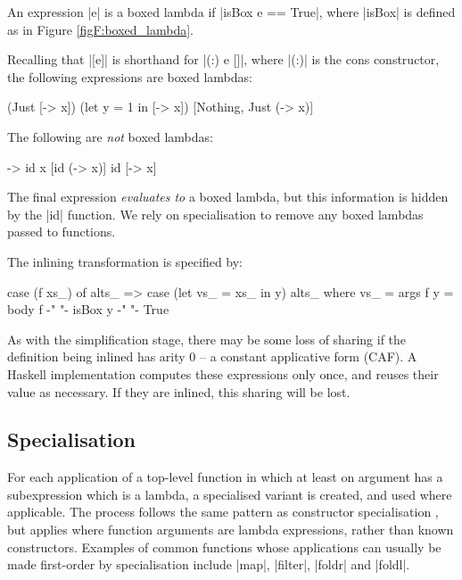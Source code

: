An expression |e| is a boxed lambda if |isBox e == True|, where |isBox| is defined as in Figure \ref{figF:boxed_lambda}.

\begin{example}
Recalling that |[e]| is shorthand for |(:) e []|, where |(:)| is the cons constructor, the following expressions are boxed lambdas:

\ignore\begin{code}
[\x -> x]
(Just [\x -> x])
(let y = 1 in [\x -> x])
[Nothing, Just (\x -> x)]
\end{code}

\noindent The following are \textit{not} boxed lambdas:

\ignore\begin{code}
\x -> id x
[id (\x -> x)]
id [\x -> x]
\end{code}

The final expression \textit{evaluates to} a boxed lambda, but this information is hidden by the |id| function. We rely on specialisation to remove any boxed lambdas passed to functions.
\end{example}

The inlining transformation is specified by:

\ignore\begin{code}
case (f xs_) of alts_
    => case (let vs_ = xs_ in y) alts_
    where
        vs_ = args f
        y = body f
        {-"  "-} isBox y {-"  "-} True
\end{code}

As with the simplification stage, there may be some loss of sharing if the definition being inlined has arity 0 -- a constant applicative form (CAF). A Haskell implementation computes these expressions only once, and reuses their value as necessary. If they are inlined, this sharing will be lost.

\subsection{Specialisation}

For each application of a top-level function in which at least on argument has a subexpression which is a lambda, a specialised variant is created, and used where applicable. The process follows the same pattern as constructor specialisation \cite{spj:specconstr}, but applies where function arguments are lambda expressions, rather than known constructors. Examples of common functions whose applications can usually be made first-order by specialisation include |map|, |filter|, |foldr| and |foldl|.

